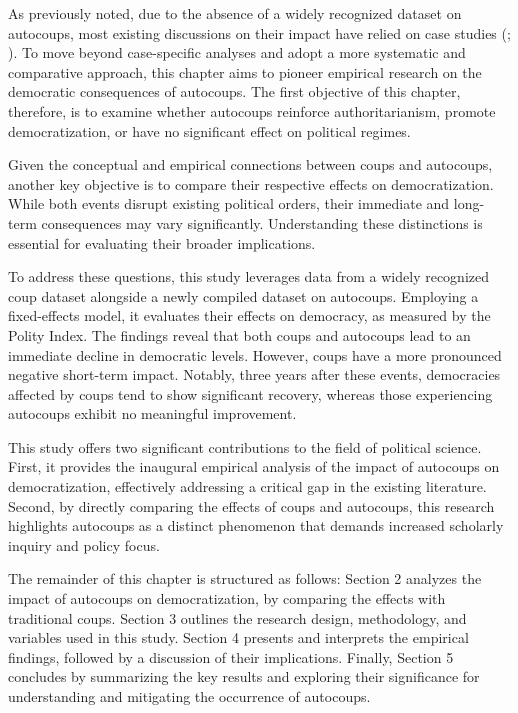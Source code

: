 \documentclass[
  12pt,
]{report}
\begin{document}
As previously noted, due to the absence of a widely recognized dataset
on autocoups, most existing discussions on their impact have relied on
case studies (;
). To move beyond
case-specific analyses and adopt a more systematic and comparative
approach, this chapter aims to pioneer empirical research on the
democratic consequences of autocoups. The first objective of this
chapter, therefore, is to examine whether autocoups reinforce
authoritarianism, promote democratization, or have no significant effect
on political regimes.

Given the conceptual and empirical connections between coups and
autocoups, another key objective is to compare their respective effects
on democratization. While both events disrupt existing political orders,
their immediate and long-term consequences may vary significantly.
Understanding these distinctions is essential for evaluating their
broader implications.

To address these questions, this study leverages data from a widely
recognized coup dataset alongside a newly compiled dataset on autocoups.
Employing a fixed-effects model, it evaluates their effects on
democracy, as measured by the Polity Index. The findings reveal that
both coups and autocoups lead to an immediate decline in democratic
levels. However, coups have a more pronounced negative short-term
impact. Notably, three years after these events, democracies affected by
coups tend to show significant recovery, whereas those experiencing
autocoups exhibit no meaningful improvement.

This study offers two significant contributions to the field of
political science. First, it provides the inaugural empirical analysis
of the impact of autocoups on democratization, effectively addressing a
critical gap in the existing literature. Second, by directly comparing
the effects of coups and autocoups, this research highlights autocoups
as a distinct phenomenon that demands increased scholarly inquiry and
policy focus.

The remainder of this chapter is structured as follows: Section 2
analyzes the impact of autocoups on democratization, by comparing the
effects with traditional coups. Section 3 outlines the research design,
methodology, and variables used in this study. Section 4 presents and
interprets the empirical findings, followed by a discussion of their
implications. Finally, Section 5 concludes by summarizing the key
results and exploring their significance for understanding and
mitigating the occurrence of autocoups.
\end{document}
